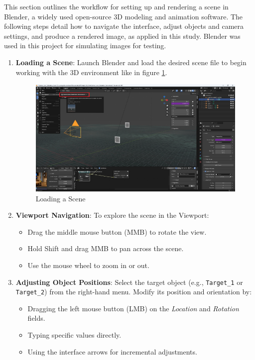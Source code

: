 \noindent This section outlines the workflow for setting up and rendering a scene in Blender, a widely used open-source 3D modeling and animation software. The following steps detail how to navigate the interface, adjust objects and camera settings, and produce a rendered image, as applied in this study. Blender was used in this project for simulating images for testing.

\begin{enumerate}
    \item \textbf{Loading a Scene}: Launch Blender and load the desired scene file to begin working with the 3D environment like in figure \ref{fig:load}.
    \begin{figure}[h]
        \centering
        \includegraphics[width=\textwidth]{Images/03edgedetect/1.png}
        \caption{Loading a Scene}
        \label{fig:load}
    \end{figure}

    \item \textbf{Viewport Navigation}: To explore the scene in the Viewport:
    \begin{itemize}
        \item Drag the middle mouse button (MMB) to rotate the view.
        \item Hold Shift and drag MMB to pan across the scene.
        \item Use the mouse wheel to zoom in or out.
    \end{itemize}
    
    \item \textbf{Adjusting Object Positions}: Select the target object (e.g., \texttt{Target\_1} or \texttt{Target\_2}) from the right-hand menu. Modify its position and orientation by:
    \begin{itemize}
        \item Dragging the left mouse button (LMB) on the \textit{Location} and \textit{Rotation} fields.
        \item Typing specific values directly.
        \item Using the interface arrows for incremental adjustments.
    \end{itemize}


\end{enumerate}
